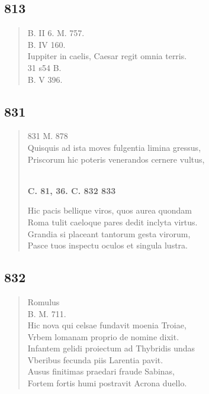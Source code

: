 \documentclass[11pt, a4paper]{report}
\begin{document}
            \subsection*{813}
      \begin{verse}
      B. II 6. M. 757. \\ B. IV 160. \\ Iuppiter in caelis, Caesar regit omnia terris. \\ 31 s54 B. \\ B. V 396. \\ 
      \end{verse}
  
            \subsection*{831}
      \begin{verse}
      831 M. 878 \\ Quisquis ad ista moves fulgentia limina gressus, \\ Priscorum hic poteris venerandos cernere vultus, \\ 
        ﻿\pagebreak 
    \begin{center} \textbf{C. 81, 36. C. 832 833} \end{center} \marginpar{[301]} Hic pacis bellique viros, quos aurea quondam \\ Roma tulit caeloque pares dedit inclyta virtus. \\ Grandia si placeant tantorum gesta virorum, \\ Pasce tuos inspectu oculos et singula lustra. \\ 
      \end{verse}
  
            \subsection*{832}
      \begin{verse}
      Romulus \\ B. M. 711. \\ Hic nova qui celsae fundavit moenia Troiae, \\ Vrbem lomanam proprio de nomine dixit. \\ Infantem gelidi proiectum ad Thybridis undas \\ Vberibus fecunda piis Larentia pavit. \\ Ausus finitimas praedari fraude Sabinas, \\ Fortem fortis humi postravit Acrona duello. \\ 
      \end{verse}
  
\end{document}
